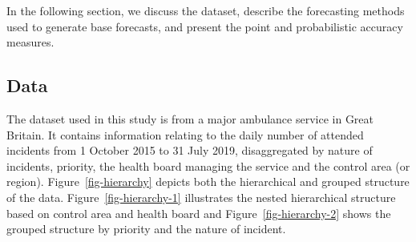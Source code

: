 \documentclass[
  authoryear,
  preprint,
  3p]{elsarticle}
\begin{document}
In the following section, we discuss the dataset, describe the
forecasting methods used to generate base forecasts, and present the
point and probabilistic accuracy measures.

\hypertarget{sec-data}{%
\subsection{Data}\label{sec-data}}

The dataset used in this study is from a major ambulance service in
Great Britain. It contains information relating to the daily number of
attended incidents from 1 October 2015 to 31 July 2019, disaggregated by
nature of incidents, priority, the health board managing the service and
the control area (or region). Figure~\ref{fig-hierarchy} depicts both
the hierarchical and grouped structure of the data.
Figure~\ref{fig-hierarchy-1} illustrates the nested hierarchical
structure based on control area and health board and
Figure~\ref{fig-hierarchy-2} shows the grouped structure by priority and
the nature of incident.
\end{document}
